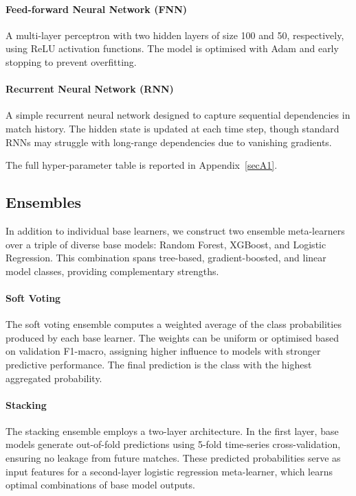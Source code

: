 \documentclass[pdflatex,sn-mathphys-num]{sn-jnl}
\theoremstyle{thmstyleone}
\theoremstyle{thmstyletwo}
\theoremstyle{thmstylethree}
\begin{document}
\paragraph{Feed-forward Neural Network (FNN)}
A multi-layer perceptron with two hidden layers of size 100 and 50, respectively, using ReLU activation functions. The model is optimised with Adam and early stopping to prevent overfitting.

\paragraph{Recurrent Neural Network (RNN)}
A simple recurrent neural network designed to capture sequential dependencies in match history. The hidden state is updated at each time step, though standard RNNs may struggle with long-range dependencies due to vanishing gradients.


The full hyper-parameter table is reported in Appendix~\ref{secA1}.

\subsection{Ensembles}\label{subsec:ensembles}

In addition to individual base learners, we construct two ensemble meta-learners over a triple of diverse base models: Random Forest, XGBoost, and Logistic Regression. This combination spans tree-based, gradient-boosted, and linear model classes, providing complementary strengths.

\paragraph{Soft Voting}
The soft voting ensemble computes a weighted average of the class probabilities produced by each base learner. The weights can be uniform or optimised based on validation F1-macro, assigning higher influence to models with stronger predictive performance. The final prediction is the class with the highest aggregated probability.

\paragraph{Stacking}
The stacking ensemble employs a two-layer architecture. In the first layer, base models generate out-of-fold predictions using 5-fold time-series cross-validation, ensuring no leakage from future matches. These predicted probabilities serve as input features for a second-layer logistic regression meta-learner, which learns optimal combinations of base model outputs.
\end{document}
